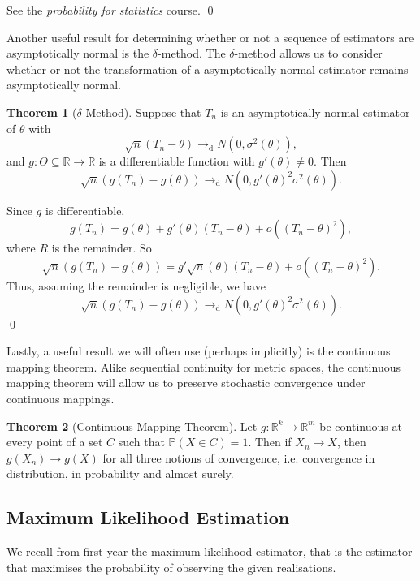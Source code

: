 \documentclass[
]{article}
\theoremstyle{definition}
\newtheorem{theorem}{Theorem}
\theoremstyle{definition}
\begin{document}
See the \emph{probability for statistics} course. \qed

Another useful result for determining whether or not a sequence of
estimators are asymptotically normal is the \(\delta\)-method. The
\(\delta\)-method allows us to consider whether or not the
transformation of a asymptotically normal estimator remains
asymptotically normal.

\begin{theorem}[\(\delta\)-Method]
  Suppose that \(T_n\) is an asymptotically normal estimator of \(\theta\) with 
  \[\sqrt{n}(T_n - \theta) \to_\text{d} N(0, \sigma^2(\theta)),\]
  and \(g : \Theta \subseteq \mathbb{R} \to \mathbb{R}\) is a differentiable 
  function with \(g'(\theta) \neq 0\). Then 
  \[\sqrt{n}(g(T_n) - g(\theta)) \to_\text{d} N(0, g'(\theta)^2 \sigma^2(\theta)).\]
\end{theorem}
\proof

Since \(g\) is differentiable,
\[g(T_n) = g(\theta) + g'(\theta)(T_n - \theta) + o((T_n - \theta)^2),\]
where \(R\) is the remainder. So
\[\sqrt{n}(g(T_n) - g(\theta)) = g'\sqrt{n}(\theta)(T_n - \theta) + o((T_n - \theta)^2).\]
Thus, assuming the remainder is negligible, we have
\[\sqrt{n}(g(T_n) - g(\theta)) \to_\text{d} N(0, g'(\theta)^2 \sigma^2(\theta)).\]
\qed

Lastly, a useful result we will often use (perhaps implicitly) is the
continuous mapping theorem. Alike sequential continuity for metric
spaces, the continuous mapping theorem will allow us to preserve
stochastic convergence under continuous mappings.

\begin{theorem}[Continuous Mapping Theorem]
  Let \(g : \mathbb{R}^k \to \mathbb{R}^m\) be continuous at every point of a set 
  \(C\) such that \(\mathbb{P}(X \in C) = 1\). Then if \(X_n \to X\), 
  then \(g(X_n) \to g(X)\) for all three notions of convergence, i.e. 
  convergence in distribution, in probability and almost surely.
\end{theorem}

\hypertarget{maximum-likelihood-estimation}{%
\subsection{Maximum Likelihood
Estimation}\label{maximum-likelihood-estimation}}

We recall from first year the maximum likelihood estimator, that is the
estimator that maximises the probability of observing the given
realisations.
\end{document}
